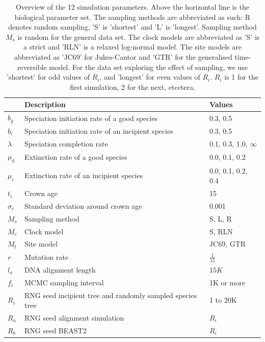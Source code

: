 \documentclass{article}
\begin{document}
\begin{table}
  \centering 
  \begin{tabular}{p{} p{} p{}}
    \hline
                          & Description & Values \\
    \hline
    \hline
    $b_g$                 & Speciation initiation rate of a good species & 0.3, 0.5 \\
    $b_i$                 & Speciation initiation rate of an incipient species & 0.3, 0.5 \\
    $\lambda$             & Speciation completion rate & 0.1, 0.3, 1.0, $\infty$ \\
    $\mu_g$               & Extinction rate of a good species & 0.0, 0.1, 0.2 \\
    $\mu_i$               & Extinction rate of an incipient species & 0.0, 0.1, 0.2, 0.4 \\
    \hline
    $t_c$                 & Crown age & 15 \\
    $\sigma_c$            & Standard deviation around crown age & 0.001 \\
    $M_s$                 & Sampling method & S, L, R \\
    $M_c$                 & Clock model & S, RLN \\
    $M_t$                 & Site model & JC69, GTR \\
    $r$                   & Mutation rate & $\frac{1}{15}$ \\
    $l_a$                 & DNA alignment length & $15K$ \\
    $f_i$                 & MCMC sampling interval & 1K or more \\
    $R_i$                 & RNG seed incipient tree and randomly sampled species tree & 1 to 20K \\
    $R_a$                 & RNG seed alignment simulation & $R_i$ \\
    $R_b$                 & RNG seed BEAST2 & $R_i$ \\
    \hline
  \end{tabular}
  \caption{
    Overview of the 12 simulation parameters. Above the horizontal line is 
    the biological parameter set. The sampling methods are abbreviated as such: R denotes random
    sampling, 'S' is 'shortest' and 'L' is 'longest'. Sampling method $M_s$ is random for the general
    data set. 
    The clock models are abbreviated as 'S' is a strict and 'RLN' is a relaxed log-normal model.
    The site models are abbreviated as 'JC69' for Jukes-Cantor and 'GTR' for the generalised 
    time-reversible model.
    For the data set exploring the effect of sampling, we use 'shortest'
    for odd values of $R_i$, and 'longest' for even values of $R_i$.
    $R_i$ is 1 for the first simulation, 2 for the next, etcetera.
  }
  \label{table:parameters}
\end{table}
\end{document}
